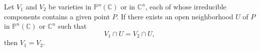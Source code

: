 Let $V_1$ and $V_2$ be varieties in $\mathbb{P}^n(\mathbb{C})$ or in $\mathbb{C}^n$, each of whose irreducible components contains a given point $P$. If there exists an open neighborhood $U$ of $P$ in $\mathbb{P}^n(\mathbb{C})$ or $\mathbb{C}^n$ such that
$$V_1 \cap U = V_2 \cap U,$$
then $V_1 = V_2$.
